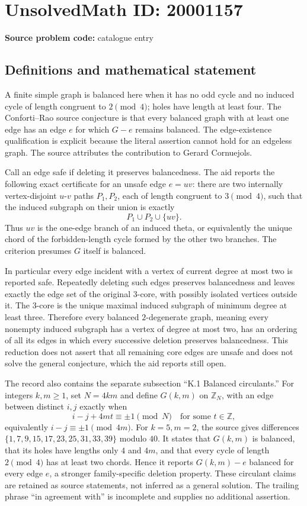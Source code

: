 \documentclass[11pt]{article}
\newcommand{\Z}{\mathbb{Z}}
\begin{document}
\section*{UnsolvedMath ID: 20001157}
\textbf{Source problem code:} catalogue entry
\subsection{Definitions and mathematical statement}
A finite simple graph is balanced here when it has no odd cycle and no induced cycle of length congruent to \(2\pmod4\); holes have length at least four. The Conforti--Rao source conjecture is that every balanced graph with at least one edge has an edge \(e\) for which \(G-e\) remains balanced. The edge-existence qualification is explicit because the literal assertion cannot hold for an edgeless graph. The source attributes the contribution to Gerard Cornuejols.

Call an edge safe if deleting it preserves balancedness. The aid reports the following exact certificate for an unsafe edge \(e=uv\): there are two internally vertex-disjoint \(u\)-\(v\) paths \(P_1,P_2\), each of length congruent to \(3\pmod4\), such that the induced subgraph on their union is exactly
\[
 P_1\cup P_2\cup\{uv\}.
\]
Thus \(uv\) is the one-edge branch of an induced theta, or equivalently the unique chord of the forbidden-length cycle formed by the other two branches. The criterion presumes \(G\) itself is balanced.

In particular every edge incident with a vertex of current degree at most two is reported safe. Repeatedly deleting such edges preserves balancedness and leaves exactly the edge set of the original \(3\)-core, with possibly isolated vertices outside it. The \(3\)-core is the unique maximal induced subgraph of minimum degree at least three. Therefore every balanced \(2\)-degenerate graph, meaning every nonempty induced subgraph has a vertex of degree at most two, has an ordering of all its edges in which every successive deletion preserves balancedness. This reduction does not assert that all remaining core edges are unsafe and does not solve the general conjecture, which the aid reports still open.

The record also contains the separate subsection ``K.1 Balanced circulants.'' For integers \(k,m\ge1\), set \(N=4km\) and define \(G(k,m)\) on \(\Z_N\), with an edge between distinct \(i,j\) exactly when
\[
 i-j+4mt\equiv\pm1\pmod N\quad\text{for some }t\in\Z,
\]
equivalently \(i-j\equiv\pm1\pmod{4m}\). For \(k=5,m=2\), the source gives differences
\(\{1,7,9,15,17,23,25,31,33,39\}\) modulo \(40\). It states that \(G(k,m)\) is balanced, that its holes have lengths only \(4\) and \(4m\), and that every cycle of length \(2\pmod4\) has at least two chords. Hence it reports \(G(k,m)-e\) balanced for every edge \(e\), a stronger family-specific deletion property. These circulant claims are retained as source statements, not inferred as a general solution. The trailing phrase ``in agreement with'' is incomplete and supplies no additional assertion.
\end{document}
